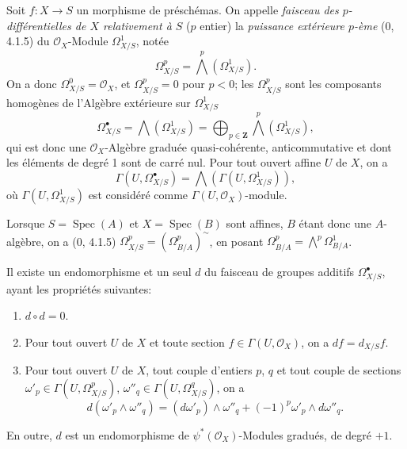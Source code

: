 \begin{env}[16.6.1]
\label{IV.16.6.1}
Soit $f:X\to S$ un morphisme de préschémas. On appelle \emph{faisceau des
$p$-différentielles de $X$ relativement à $S$} ($p$ entier) la
\emph{puissance extérieure $p$-ème} (0, 4.1.5) du $\mathcal{O}_X$-Module
$\Omega_{X/S}^1$, notée
\[
  \Omega_{X/S}^p=\bigwedge^p(\Omega_{X/S}^1).
  \tag{16.6.1.1}
  \label{IV.16.6.1.1}
\]
On a donc $\Omega_{X/S}^0=\mathcal{O}_X$, et $\Omega_{X/S}^p=0$ pour $p<0$;
les $\Omega_{X/S}^p$ sont les composants homogènes de l'Algèbre extérieure
sur $\Omega_{X/S}^1$
\[
  \Omega_{X/S}^{\bullet}=\bigwedge(\Omega_{X/S}^1)
  =\bigoplus_{p\in\mathbf{Z}}\bigwedge^p(\Omega_{X/S}^1),
  \tag{16.6.1.2}
  \label{IV.16.6.1.2}
\]
qui est donc une $\mathcal{O}_X$-Algèbre graduée quasi-cohérente,
anticommutative et dont les éléments de degré 1 sont de carré nul. Pour tout
ouvert affine $U$ de $X$, on a
\[
  \Gamma(U,\Omega_{X/S}^{\bullet})
  =\bigwedge(\Gamma(U,\Omega_{X/S}^1)),
\]
où $\Gamma(U,\Omega_{X/S}^1)$ est considéré comme
$\Gamma(U,\mathcal{O}_X)$-module.

Lorsque $S=\operatorname{Spec}(A)$ et $X=\operatorname{Spec}(B)$ sont
affines, $B$ étant donc une $A$-algèbre, on a (0, 4.1.5)
$\Omega_{X/S}^p=(\Omega_{B/A}^p)^{\sim}$, en posant
$\Omega_{B/A}^p=\bigwedge^p\Omega_{B/A}^1$.
\end{env}

\begin{theorem}[16.6.2]
\label{IV.16.6.2}
Il existe un endomorphisme et un seul $d$ du faisceau de groupes additifs
$\Omega_{X/S}^{\bullet}$, ayant les propriétés suivantes:
\begin{enumerate}
\item[(i)] $d\circ d=0$.
\item[(ii)] Pour tout ouvert $U$ de $X$ et toute section
$f\in\Gamma(U,\mathcal{O}_X)$, on a $df=d_{X/S}f$.
\item[(iii)] Pour tout ouvert $U$ de $X$, tout couple d'entiers $p$, $q$ et
tout couple de sections
$\omega'_p\in\Gamma(U,\Omega_{X/S}^p)$,
$\omega''_q\in\Gamma(U,\Omega_{X/S}^q)$, on a
\[
  d(\omega'_p\wedge\omega''_q)
  =(d\omega'_p)\wedge\omega''_q
  +(-1)^p\omega'_p\wedge d\omega''_q.
  \tag{16.6.2.1}
  \label{IV.16.6.2.1}
\]
\end{enumerate}
En outre, $d$ est un endomorphisme de $\psi^*(\mathcal{O}_X)$-Modules
gradués, de degré $+1$.
\end{theorem}


